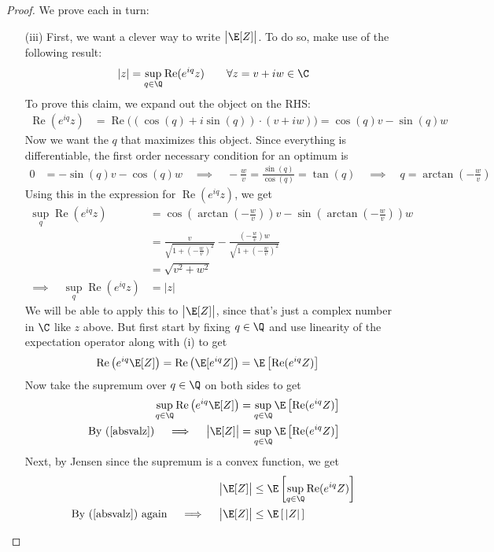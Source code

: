 \documentclass[12pt]{article}
\theoremstyle{plain}
\theoremstyle{definition}
\theoremstyle{remark}
\renewcommand{\Re}{\operatorname{Re}}
\begin{document}
\begin{proof}
We prove each in turn:
\begin{enumerate}
  \item[(iii)]
    First, we want a clever way to write $\big|\E[Z]\big|$. To do so,
    make use of the following result:
    \begin{align}
      |z| = \sup_{q\in\Q} \Re(e^{iq}z)
      \qquad\forall z = v+iw\in\C
      \label{absvalz}
    \end{align}
    To prove this claim, we expand out the object on the RHS:
    \begin{align*}
      \Re(e^{iq}z)
      &= \Re\big(
      \left(\cos(q) + i\sin(q)\right)
      \cdot
      \left(v + iw\right)
      \big)
      =\cos(q)v - \sin(q)w
    \end{align*}
    Now we want the $q$ that maximizes this object. Since everything is
    differentiable, the first order necessary condition for an optimum
    is
    \begin{align*}
      0 &=-\sin(q)v - \cos(q)w
      \quad\implies\quad
      -\frac{w}{v} =
      \frac{\sin(q)}{\cos(q)} = \tan(q)
      \quad \implies\quad
      q = \arctan\left(-\frac{w}{v}\right)
    \end{align*}
    Using this in the expression for $\Re(e^{iq}z)$, we get
    \begin{align*}
      \sup_q
      \Re(e^{iq}z)
      &=
      \cos\left(\arctan\left(-\frac{w}{v}\right)\right)v -
      \sin\left(\arctan\left(-\frac{w}{v}\right)\right)w \\
      &=
      \frac{v}{\sqrt{1+\left(-\frac{w}{v}\right)^2}}
      -
      \frac{\left(-\frac{w}{v}\right)w}{\sqrt{1+\left(-\frac{w}{v}\right)^2}}
      \\
      &= \sqrt{v^2+w^2} \\
      \implies\quad
      \sup_q
      \Re(e^{iq}z)
      &= |z|
    \end{align*}
    We will be able to apply this to $\big|\E[Z]\big|$, since that's
    just a complex number in $\C$ like $z$ above. But first start by
    fixing $q\in\Q$ and use linearity of the expectation operator along
    with (i) to get
    \begin{align*}
      \Re\left(e^{iq}\E[Z]\right)
      &= \Re\left(\E[e^{iq}Z]\right)
      = \E\left[\Re(e^{iq}Z)\right]
    \end{align*}
    Now take the supremum over $q\in\Q$ on both sides to get
    \begin{align*}
      \sup_{q\in\Q}\Re\left(e^{iq}\E[Z]\right)
      &= \sup_{q\in\Q}\E\left[\Re(e^{iq}Z)\right] \\
      \text{By (\ref{absvalz})}\quad\implies\quad
      \big|\E[Z]\big|
      &= \sup_{q\in\Q}\E\left[\Re(e^{iq}Z)\right]
    \end{align*}
    Next, by Jensen since the supremum is a convex function, we get
    \begin{align*}
      \big|\E[Z]\big|
      &\leq \E\left[\sup_{q\in\Q}\Re(e^{iq}Z)\right] \\
      \text{By (\ref{absvalz}) again}\quad\implies\quad
      \big|\E[Z]\big|
      &\leq \E\left[\,|Z|\,\right]
    \end{align*}


\end{enumerate}
\end{proof}
\end{document}
